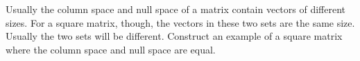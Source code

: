 Usually the column space and null space of a matrix contain vectors of different sizes.  For a square matrix, though, the vectors in these two sets are the same size.  Usually the two sets will be different.  Construct an example of a square matrix where the column space and null space are equal.
